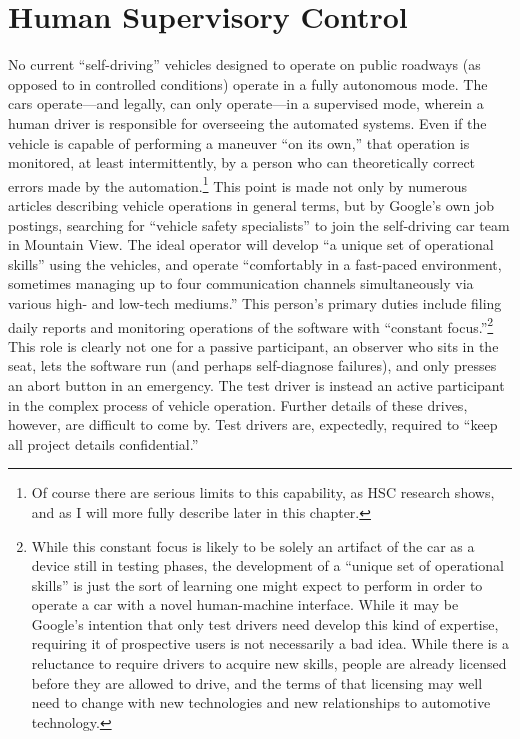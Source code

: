 \section{Human Supervisory Control}

No current ``self-driving'' vehicles designed to operate on public
roadways (as opposed to in controlled conditions) operate in a fully
autonomous mode. The cars operate---and legally, can only
operate---in
a supervised mode, wherein a human driver is responsible for
overseeing the automated systems. Even if the vehicle is capable of
performing a maneuver ``on its own,'' that operation is monitored, at
least intermittently, by a person who can theoretically correct errors
made by the automation.\footnote{Of course there are serious
  limits to this capability, as HSC research shows, and as I will
  more fully describe later in this chapter.} This point is made not
only by numerous articles describing vehicle operations in general terms,
but by Google's
own job postings, searching for ``vehicle safety specialists'' to join
the self-driving car team in Mountain View. The ideal operator will
develop ``a unique set of operational skills'' using the vehicles, and
operate ``comfortably in a fast-paced environment, sometimes managing
up to four communication channels simultaneously via various high- and
low-tech mediums.''\cite{googleJobPosting} This person's primary
duties include filing daily reports and monitoring operations of the
software with ``constant focus.''\footnote{While this constant focus
  is likely to be solely an artifact of the car as a device still in
  testing phases, the development of a ``unique set of operational
  skills'' is just the sort of learning one might expect to perform in
order to operate a car with a novel human-machine interface. While it
may be Google's intention that only test drivers need develop this
kind of expertise, requiring it of prospective users is not
necessarily a bad idea. While there is a reluctance to require drivers
to acquire new skills, people are already licensed before they are
allowed to drive, and the terms of that licensing may well need to
change with new technologies and new relationships to automotive
technology.} This role is clearly not one for a passive participant,
an observer who sits in the seat, lets the software run (and perhaps
self-diagnose failures), and only presses an abort button in an
emergency. The test driver is instead an active participant in the
complex process of 
vehicle operation. Further details of these drives, however,
are difficult to come by. Test drivers are, expectedly, required to
``keep all project details confidential.''\cite{googleJobPosting}


